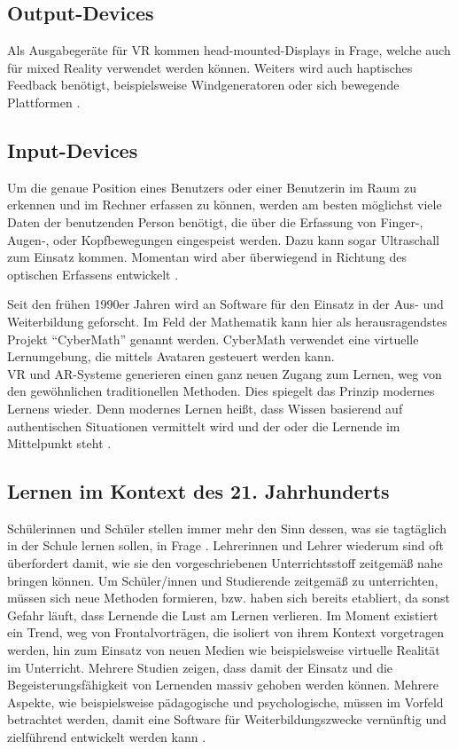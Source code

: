 \documentclass[deutsch]{llncs}
\begin{document}
\begin{itemize}
\subsection{Output-Devices}
Als Ausgabegeräte für VR kommen head-mounted-Displays in Frage, welche auch für mixed Reality verwendet werden können. Weiters wird auch haptisches Feedback benötigt, beispielsweise Windgeneratoren oder sich bewegende Plattformen \cite{Klampfer}.
\subsection{Input-Devices}
Um die genaue Position eines Benutzers oder einer Benutzerin im Raum zu erkennen und im Rechner erfassen zu können, werden am besten möglichst viele Daten der benutzenden Person benötigt, die über die Erfassung von Finger-, Augen-, oder Kopfbewegungen eingespeist werden. Dazu kann sogar Ultraschall zum Einsatz kommen. Momentan wird aber überwiegend in Richtung des optischen Erfassens entwickelt \cite{Klampfer}. 
\end{itemize}
Seit den frühen 1990er Jahren wird an Software für den Einsatz in der Aus- und Weiterbildung geforscht. Im Feld der Mathematik kann hier als herausragendstes Projekt ``CyberMath'' genannt werden. CyberMath verwendet eine virtuelle Lernumgebung, die mittels Avataren gesteuert werden kann. \\
VR und AR-Systeme generieren einen ganz neuen Zugang zum Lernen, weg von den gewöhnlichen traditionellen Methoden. Dies spiegelt das Prinzip modernes Lernens wieder. Denn modernes Lernen heißt, dass Wissen basierend auf authentischen Situationen vermittelt wird und der oder die Lernende im Mittelpunkt steht \cite{Klampfer,unknown}.

\subsection{Lernen im Kontext des 21. Jahrhunderts}
Schülerinnen und Schüler stellen immer mehr den Sinn dessen, was sie tagtäglich in der Schule lernen sollen, in Frage \cite{Klampfer}. Lehrerinnen und Lehrer wiederum sind oft überfordert damit, wie sie den vorgeschriebenen Unterrichtsstoff zeitgemäß nahe bringen können. Um Schüler/innen und Studierende zeitgemäß zu unterrichten, müssen sich neue Methoden formieren, bzw. haben sich bereits etabliert, da sonst Gefahr läuft, dass Lernende die Lust am Lernen verlieren. Im Moment existiert ein Trend, weg von Frontalvorträgen, die isoliert von ihrem Kontext vorgetragen werden, hin zum Einsatz von neuen Medien wie beispielsweise virtuelle Realität im Unterricht. Mehrere Studien \cite{Hu-Au} zeigen, dass damit der Einsatz und die Begeisterungsfähigkeit von Lernenden massiv gehoben werden können.
Mehrere Aspekte, wie beispielsweise pädagogische und psychologische, müssen im Vorfeld betrachtet werden, damit eine Software für Weiterbildungszwecke vernünftig und zielführend entwickelt werden kann \cite{article}.
\end{document}
